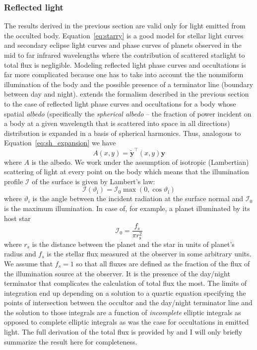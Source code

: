 \documentclass[12pt,dvipsnames]{report}
\begin{document}
\subsubsection{Reflected light}
The results derived in the previous section are valid only for light emitted
from the occulted body. Equation~\ref{eq:starry} is a good model for stellar
light curves and secondary eclipse light curves and phase curves of planets
observed in the mid to far infrared wavelengths where the contribution of
scattered starlight to total flux is negligible. Modeling reflected light phase
curves and occultations is far more complicated because one has to take into
account the the nonuniform illumination of the body and the possible presence
of a terminator line (boundary between day and night).
\citet{2021arXiv210306275L} extends the formalism described in the previous
section to the case of reflected light phase curves and occultations for a body
whose spatial \emph{albedo} (specifically the \emph{spherical albedo} -- the
fraction of power incident on a body at a given wavelength that is scattered
into space in all directions) distribution is expanded in a basis of spherical
harmonics. Thus, analogous to Equation~\ref{eq:sh_expansion} we have
\begin{equation}
    A(x, y)=\tilde{\mathbf{y}}^{\intercal}(x, y) \mathbf{y}
\end{equation}
where $A$ is the albedo. We work under the assumption of isotropic (Lambertian)
scattering of light at every point on the body which means that the illumination
profile $\mathcal{I}$ of the surface is given by Lambert's law:
\begin{equation}
    \mathcal{I}\left(\vartheta_{\mathrm{i}}\right)=\mathcal{I}_{0} \max \left(0, \cos \vartheta_{\mathrm{i}}\right)
\end{equation}
where $\vartheta_i$ is the angle between the incident radiation at the surface normal
and $\mathcal{I}_0$ is the maximum illumination. In case of, for example, a planet illuminated
by its host star \citep[Appendix A.2 in][]{2021arXiv210306275L}
\begin{equation}
    \mathcal{I}_{0}=\frac{f_{s}}{\pi r_{\mathrm{s}}^{2}}
\end{equation}
where $r_s$ is the distance between the planet and the star in units of planet's radius
and $f_s$ is the stellar flux measured at the observer in some arbitrary units.
We assume that $f_s=1$ so that all fluxes are defined as the fraction of the flux
of the illumination source at the observer.
It is the presence of the day/night terminator that complicates the calculation
of total flux the most. The limits of integration end up depending on a
solution to a quartic equation specifying the points of intersection between
the occultor and the day/night terminator line and the solution to those
integrals are a function of \emph{incomplete} elliptic integrals as opposed to
complete elliptic integrals as was the case for occultations in emitted light.
The full derivation of the total flux is provided by \citet{2021arXiv210306275L} and
I will only briefly summarize  the result here for completeness.
\end{document}
